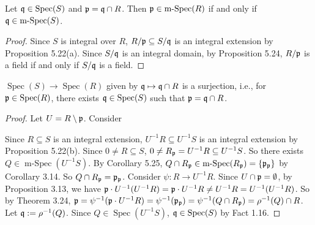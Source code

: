 \begin{corollary}
    Let $\mathfrak{q} \in \operatorname{Spec}(S)$ and $\mathfrak{p} = \mathfrak{q} \cap R$. Then $\mathfrak{p} \in \operatorname{m-Spec}(R)$ if and only if $\mathfrak{q} \in \operatorname{m-Spec}(S)$. 
\end{corollary}

\begin{proof}
    Since $S$ is integral over $R$, $R/\mathfrak{p} \subseteq S/\mathfrak{q}$ is an integral extension by Proposition 5.22(a). Since $S/\mathfrak{q}$ is an integral domain, by Proposition 5.24, $R/\mathfrak{p}$ is a field if and only if $S/\mathfrak{q}$ is a field.
\end{proof}

\begin{theorem}
    $\operatorname{Spec}(S) \to \operatorname{Spec}(R)$ given by $\mathfrak{q} \mapsto \mathfrak{q} \cap R$ is a surjection, i.e., for $\mathfrak{p} \in \operatorname{Spec}(R)$, there exists $\mathfrak{q} \in \operatorname{Spec}(S)$ such that $\mathfrak{p} = \mathfrak{q} \cap R$.
\end{theorem}

\begin{proof}
    Let $U = R \setminus \mathfrak{p}$. Consider
    \begin{center}
    \end{center}
    Since $R \subseteq S$ is an integral extension, $U^{-1}R \subseteq U^{-1}S$ is an integral extension by Proposition 5.22(b). Since $0 \neq R \subseteq S$, $0 \neq R_{\mathfrak{p}} = U^{-1}R \subseteq U^{-1}S$. So there exists $Q \in \operatorname{m-Spec}(U^{-1}S)$. By Corollary 5.25, $Q \cap R_{\mathfrak{p}}\in \operatorname{m-Spec}(R_{\mathfrak{p}}) = \{\mathfrak{p}_{\mathfrak{p}}\}$ by Corollary 3.14. So $Q \cap R_{\mathfrak{p}} = \mathfrak{p}_{\mathfrak{p}}$. Consider $\psi: R \to U^{-1}R$. Since $U \cap \mathfrak{p} = \emptyset$, by Proposition 3.13, we have $\mathfrak{p} \cdot U^{-1}(U^{-1}R) = \mathfrak{p} \cdot U^{-1}R \neq U^{-1}R = U^{-1}(U^{-1}R)$. So by Theorem 3.24, $\mathfrak{p} = \psi^{-1}(\mathfrak{p} \cdot U^{-1}R) = \psi^{-1}(\mathfrak{p}_{\mathfrak{p}}) = \psi^{-1}(Q \cap R_{\mathfrak{p}}) = \rho^{-1}(Q) \cap R$. Let $\mathfrak{q} := \rho^{-1}(Q)$. Since $Q \in \operatorname{Spec}(U^{-1}S)$, $\mathfrak{q} \in \operatorname{Spec}(S)$ by Fact 1.16.
\end{proof}

